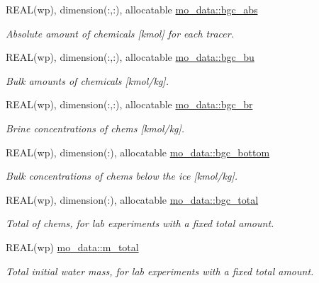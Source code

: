 \begin{DoxyCompactItemize}
REAL(wp), dimension(:,:), allocatable \hyperlink{namespacemo__data_a0f5cfd95b789313c0a78a9b7feae167a}{mo\_\-data::bgc\_\-abs}
\begin{DoxyCompactList}\small\item\em Absolute amount of chemicals \mbox{[}kmol\mbox{]} for each tracer. \item\end{DoxyCompactList}\item 
REAL(wp), dimension(:,:), allocatable \hyperlink{namespacemo__data_a92107cbfdb8869916b149d942db53cad}{mo\_\-data::bgc\_\-bu}
\begin{DoxyCompactList}\small\item\em Bulk amounts of chemicals \mbox{[}kmol/kg\mbox{]}. \item\end{DoxyCompactList}\item 
REAL(wp), dimension(:,:), allocatable \hyperlink{namespacemo__data_a8c950715d79f982020fbc43ec03a02e8}{mo\_\-data::bgc\_\-br}
\begin{DoxyCompactList}\small\item\em Brine concentrations of chems \mbox{[}kmol/kg\mbox{]}. \item\end{DoxyCompactList}\item 
REAL(wp), dimension(:), allocatable \hyperlink{namespacemo__data_a7a31686a7563ca77bbe2aa8eaa14cfd2}{mo\_\-data::bgc\_\-bottom}
\begin{DoxyCompactList}\small\item\em Bulk concentrations of chems below the ice \mbox{[}kmol/kg\mbox{]}. \item\end{DoxyCompactList}\item 
REAL(wp), dimension(:), allocatable \hyperlink{namespacemo__data_a15d6538801561a4daac86ca856ff99c5}{mo\_\-data::bgc\_\-total}
\begin{DoxyCompactList}\small\item\em Total of chems, for lab experiments with a fixed total amount. \item\end{DoxyCompactList}\item 
REAL(wp) \hyperlink{namespacemo__data_a075b7537738c70f4bc97adf551be3b75}{mo\_\-data::m\_\-total}
\begin{DoxyCompactList}\small\item\em Total initial water mass, for lab experiments with a fixed total amount. \item\end{DoxyCompactList}\item 

\end{DoxyCompactItemize}
